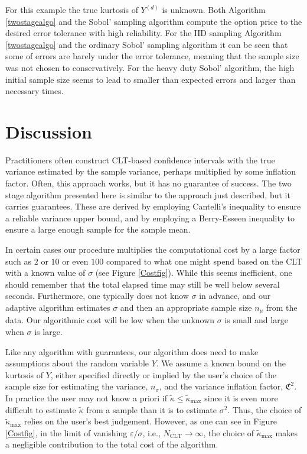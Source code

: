\documentclass[graybox]{svmult}
\newcommand{\fudge}{\mathfrak{C}}
\newcommand{\tkappa}{\tilde{\kappa}}
\begin{document}
For this example the true kurtosis of $Y^{(d)}$ is unknown.  Both  Algorithm \ref{twostagealgo} and the  Sobol' sampling algorithm compute the option price to the desired error tolerance with high reliability.  For the IID sampling Algorithm \ref{twostagealgo} and the ordinary Sobol' sampling algorithm it can be seen that some of errors are barely under the error tolerance, meaning that the sample size was not chosen to conservatively.  For the heavy duty Sobol' algorithm, the high initial sample size seems to lead to smaller than expected errors and larger than necessary times.

\section{Discussion}

Practitioners often construct CLT-based confidence intervals with the true variance estimated by the sample variance, perhaps multiplied by some inflation factor.  Often, this approach works, but it has no guarantee of success.  The two stage algorithm presented here is similar to the approach just described, but it carries guarantees. These are derived by employing Cantelli's inequality to ensure a reliable variance upper bound, and by employing a Berry-Esseen inequality to ensure a large enough sample for the sample mean.  

In certain cases our procedure multiplies the computational cost by a large factor such as $2$ or $10$ or even $100$ compared to what one might spend based on the CLT with a known value of $\sigma$ (see Figure \ref{Costfig}).  While this seems inefficient, one should remember that the total elapsed time may still be well below several seconds.  Furthermore, one typically does not know $\sigma$ in advance, and our adaptive algorithm estimates $\sigma$ and then an appropriate sample size $n_\mu$ from the data.  Our algorithmic cost will be low when the unknown $\sigma$ is small and large when $\sigma$ is large.

Like any algorithm with guarantees, our algorithm does need to make assumptions about the random variable $Y$.  We assume a known bound on the kurtosis of $Y$, either specified directly or implied by the user's choice of the sample size for estimating the variance, $n_\sigma$, and the variance inflation factor, $\fudge^2$.  In practice the user may not know a priori if $\tkappa \le \tkappa_{\max}$ since it is even more difficult to estimate $\tkappa$ from a sample than it is to estimate $\sigma^2$.  Thus, the choice of $\tkappa_{\max}$ relies on the user's best judgement.  However, as one can see in Figure \ref{Costfig}, in the limit of vanishing $\varepsilon/\sigma$, i.e., $N_{\text{CLT}} \to \infty$, the choice of $\tkappa_{\max}$ makes a negligible contribution to the total cost of the algorithm.
\end{document}
